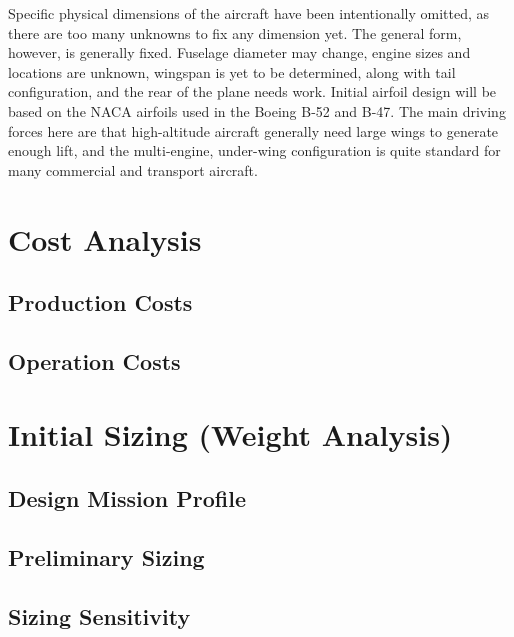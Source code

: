\documentclass[12pt]{article}
\begin{document}
Specific physical dimensions of the aircraft have been intentionally omitted, as there are too many unknowns to fix any dimension yet.
The general form, however, is generally fixed.
Fuselage diameter may change, engine sizes and locations are unknown, wingspan is yet to be determined, along with tail configuration, and the rear of the plane needs work.
Initial airfoil design will be based on the NACA airfoils used in the Boeing B-52 and B-47.
The main driving forces here are that high-altitude aircraft generally need large wings to generate enough lift, and the multi-engine, under-wing configuration is quite standard for many commercial and transport aircraft.
	
	
\section{Cost Analysis}
\subsection{Production Costs}

\subsection{Operation Costs}


\section{Initial Sizing (Weight Analysis)}
\subsection{Design Mission Profile}

\subsection{Preliminary Sizing}

\subsection{Sizing Sensitivity}

\clearpage
\printbibliography[heading=bibnumbered]
\end{document}
